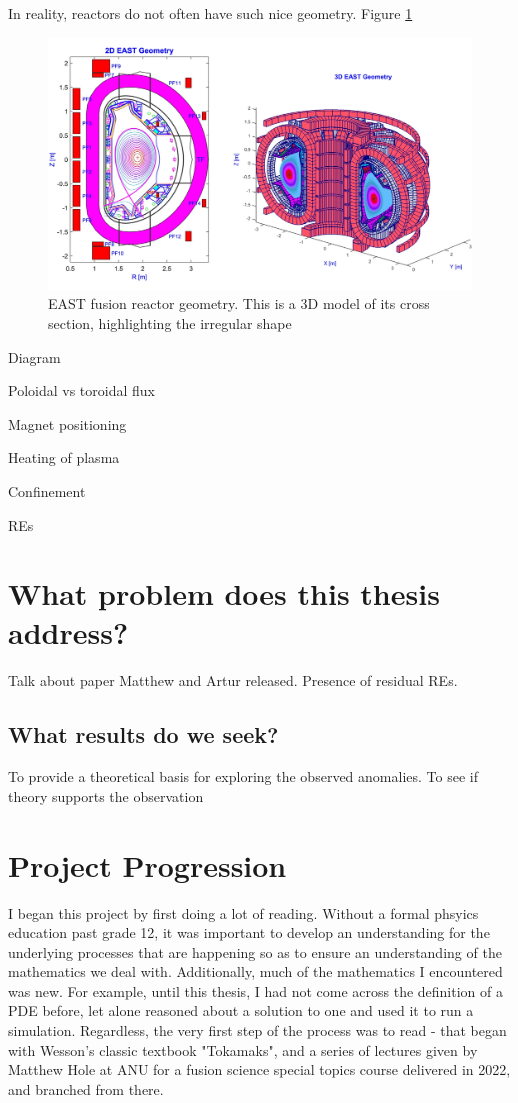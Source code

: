 In reality, reactors do not often have such nice geometry. Figure \ref{fig:east-geometry}
\begin{figure}[h!]
    \centering
    \includegraphics[scale=0.2]{imgs/c1/east-cross-section.png}
    \caption{EAST fusion reactor geometry. This is a 3D model of its cross section, highlighting the irregular shape \cite{east-geometry-article}}
    \label{fig:east-geometry}
\end{figure}

Diagram

Poloidal vs toroidal flux

Magnet positioning

Heating of plasma

Confinement

REs

\section{What problem does this thesis address?}

Talk about paper Matthew and Artur released. Presence of residual REs.

\subsection{What results do we seek?}

To provide a theoretical basis for exploring the observed anomalies. 
To see if theory supports the observation

\section{Project Progression}

I began this project by first doing a lot of reading. Without a formal phsyics education past grade 12, it was 
important to develop an understanding for the underlying processes that are happening so as to ensure an understanding 
of the mathematics we deal with. Additionally, much of the mathematics I encountered was new. For example, until this thesis, I had 
not come across the definition of a PDE before, let alone reasoned about a solution to one and used it to run a simulation. Regardless, 
the very first step of the process was to read - that began with Wesson's classic textbook "Tokamaks", and a series of lectures 
given by Matthew Hole at ANU for a fusion science special topics course delivered in 2022, and branched from there.

